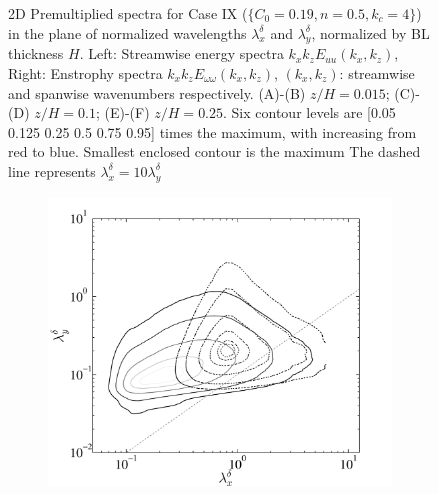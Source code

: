\begin{figure}
        \caption[Premultiplied Spectra 1]{2D Premultiplied spectra for Case IX ($\lbrace C_0 = 0.19, n = 0.5, k_c = 4\rbrace$) in the plane of normalized wavelengths $\lambda_x^{\delta}$ and $\lambda_y^{\delta}$, normalized by BL thickness $H$. Left: Streamwise energy spectra $k_xk_zE_{uu}(k_x,k_z)$, Right: Enstrophy spectra $k_xk_zE_{\omega\omega}(k_x,k_z)$, $(k_x, k_z)$: streamwise and spanwise wavenumbers respectively. (A)-(B) $z/H = 0.015$; (C)-(D) $z/H = 0.1$; (E)-(F) $z/H = 0.25$. Six contour levels are [0.05 0.125 0.25 0.5 0.75 0.95] times the maximum, with increasing from red to blue. Smallest enclosed contour is the maximum The dashed line represents $\lambda_x^{\delta} = 10 \lambda_y^{\delta}$}\label{fig:2d_spec_diss}
\end{figure}

\begin{figure}
\centering
        \begin{subfigure}[t]{0.5\textwidth}
                \includegraphics[width=\linewidth]{Fig3/energy_contour_ABL_n2n05_level2.pdf}
                \caption{}
                \label{fig:energy1b}
        \end{subfigure}%
        \centering
        \begin{subfigure}[t]{0.5\textwidth}

\end{subfigure}
\end{figure}
